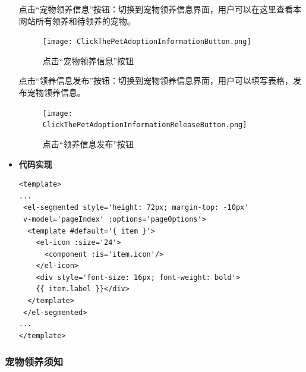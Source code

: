 \begin{itemize}
	点击“宠物领养信息”按钮：切换到宠物领养信息界面，用户可以在这里查看本网站所有领养和待领养的宠物。
	
	\begin{figure}[H]
		\centering
		\texttt{[image: ClickThePetAdoptionInformationButton.png]} 
		\caption{点击“宠物领养信息”按钮}
		\label{fig:Click the Pet Adoption Information button}
	\end{figure}
	
	点击“领养信息发布”按钮：切换到宠物领养信息界面，用户可以填写表格，发布宠物领养信息。
	
	\begin{figure}[H]
		\centering
		\texttt{[image: ClickThePetAdoptionInformationReleaseButton.png]} 
		\caption{点击“领养信息发布”按钮}
		\label{fig:Click the Adoption Information Release button}
	\end{figure}
	
	\item[] \textbf{代码实现}
	\begin{verbatim}
<template>
...
 <el-segmented style='height: 72px; margin-top: -10px' 
 v-model='pageIndex' :options='pageOptions'>
  <template #default='{ item }'>
    <el-icon :size='24'>
      <component :is='item.icon'/>
    </el-icon>
    <div style='font-size: 16px; font-weight: bold'>
    {{ item.label }}</div>
  </template>
 </el-segmented>
...
</template>
	\end{verbatim}
	
\end{itemize}

\subsubsection{宠物领养须知}

